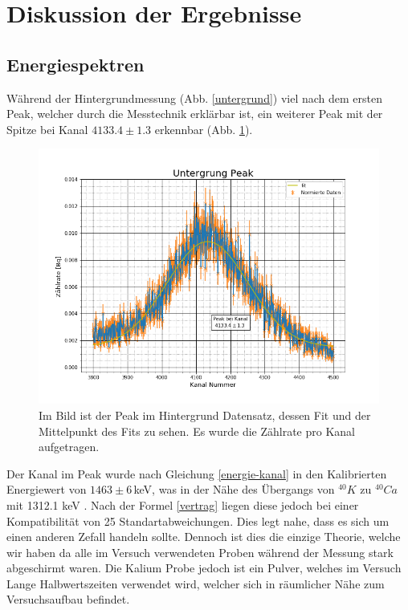 \section{Diskussion der Ergebnisse}
\subsection{Energiespektren}
Während der Hintergrundmessung (Abb. \ref{untergrund}) viel nach dem ersten Peak, welcher durch die Messtechnik erklärbar ist, ein weiterer Peak mit der Spitze bei Kanal $4133.4\pm1.3$ erkennbar (Abb. \ref{untergrund_peak}).
\begin{figure}[h]
	\centering
	\includegraphics[scale=0.5]{Bilder/untergrund_peak}
	\caption[Peak im Hintergrund]{\small Im Bild ist der Peak im  Hintergrund Datensatz, dessen Fit und der Mittelpunkt des Fits zu sehen. Es wurde die Zählrate pro Kanal aufgetragen.}
	\label{untergrund_peak}
\end{figure}
Der Kanal im Peak wurde nach Gleichung \ref{energie-kanal} in den Kalibrierten Energiewert von $1463 \pm 6\,$keV, was in der Nähe des Übergangs von $^{40}K$ zu $^{40}Ca$ mit 1312.1 keV \cite{staatsex_szinti}. Nach der Formel \ref{vertrag} liegen diese jedoch bei einer Kompatibilität von 25 Standartabweichungen. Dies legt nahe, dass es sich um einen anderen Zefall handeln sollte. Dennoch ist dies die einzige Theorie, welche wir haben da alle im Versuch verwendeten Proben während der Messung stark abgeschirmt waren. Die Kalium Probe jedoch ist ein Pulver, welches im Versuch Lange Halbwertszeiten verwendet wird, welcher sich in räumlicher Nähe zum Versuchsaufbau befindet.\par
